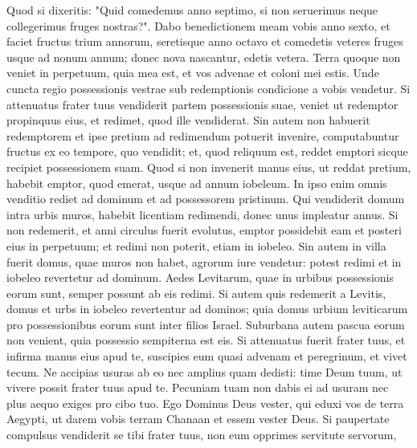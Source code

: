 \begin{biblechapter}
\begin{biblechapter}
\begin{biblechapter}
\begin{biblechapter}
\begin{biblechapter}
\begin{biblechapter}
\begin{biblechapter}
\begin{biblechapter}
\begin{biblechapter}
\begin{biblechapter}
\begin{biblechapter}
\begin{biblechapter}
\begin{biblechapter}
\begin{biblechapter}
\begin{biblechapter}
\begin{biblechapter}
\begin{biblechapter}
\begin{biblechapter}
\begin{biblechapter}
\begin{biblechapter}
\begin{biblechapter}
\begin{biblechapter}
\begin{biblechapter}
\begin{biblechapter}
\begin{biblechapter}
 \verse Quod si dixeritis: "Quid comedemus anno septimo, si non seruerimus neque collegerimus fruges nostras?". 
\verse Dabo benedictionem meam vobis anno sexto, et faciet fructus trium annorum, 
\verse seretisque anno octavo et comedetis veteres fruges usque ad nonum annum; donec nova nascantur, edetis vetera.
 \verse Terra quoque non veniet in perpetuum, quia mea est, et vos advenae et coloni mei estis. 
\verse Unde cuncta regio possessionis vestrae sub redemptionis condicione a vobis vendetur.
 \verse Si attenuatus frater tuus vendiderit partem possessionis suae, veniet ut redemptor propinquus eius, et redimet, quod ille vendiderat. 
\verse Sin autem non habuerit redemptorem et ipse pretium ad redimendum potuerit invenire, 
\verse computabuntur fructus ex eo tempore, quo vendidit; et, quod reliquum est, reddet emptori sicque recipiet possessionem suam. 
\verse Quod si non invenerit manus eius, ut reddat pretium, habebit emptor, quod emerat, usque ad annum iobeleum. In ipso enim omnis venditio rediet ad dominum et ad possessorem pristinum.
 \verse Qui vendiderit domum intra urbis muros, habebit licentiam redimendi, donec unus impleatur annus. 
\verse Si non redemerit, et anni circulus fuerit evolutus, emptor possidebit eam et posteri eius in perpetuum; et redimi non poterit, etiam in iobeleo. 
\verse Sin autem in villa fuerit domus, quae muros non habet, agrorum iure vendetur: potest redimi et in iobeleo revertetur ad dominum.
 \verse Aedes Levitarum, quae in urbibus possessionis eorum sunt, semper possunt ab eis redimi. 
\verse Si autem quis redemerit a Levitis, domus et urbs in iobeleo revertentur ad dominos; quia domus urbium leviticarum pro possessionibus eorum sunt inter filios Israel. 
\verse Suburbana autem pascua eorum non venient, quia possessio sempiterna est eis.
 \verse Si attenuatus fuerit frater tuus, et infirma manus eius apud te, suscipies eum quasi advenam et peregrinum, et vivet tecum. 
\verse Ne accipias usuras ab eo nec amplius quam dedisti: time Deum tuum, ut vivere possit frater tuus apud te. 
 \verse Pecuniam tuam non dabis ei ad usuram nec plus aequo exiges pro cibo tuo. 
 \verse Ego Dominus Deus vester, qui eduxi vos de terra Aegypti, ut darem vobis terram Chanaan et essem vester Deus.
 \verse Si paupertate compulsus vendiderit se tibi frater tuus, non eum opprimes servitute servorum, 

\end{biblechapter}
\end{biblechapter}
\end{biblechapter}
\end{biblechapter}
\end{biblechapter}
\end{biblechapter}
\end{biblechapter}
\end{biblechapter}
\end{biblechapter}
\end{biblechapter}
\end{biblechapter}
\end{biblechapter}
\end{biblechapter}
\end{biblechapter}
\end{biblechapter}
\end{biblechapter}
\end{biblechapter}
\end{biblechapter}
\end{biblechapter}
\end{biblechapter}
\end{biblechapter}
\end{biblechapter}
\end{biblechapter}
\end{biblechapter}
\end{biblechapter}
